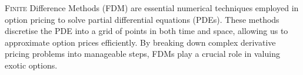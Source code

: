 \lettrine[lines=2, lhang=0.1]{F}{inite} Difference Methods (FDM) are essential numerical techniques employed in option pricing to solve partial differential equations (PDEs). These methods discretise the PDE into a grid of points in both time and space, allowing us to approximate option prices efficiently. By breaking down complex derivative pricing problems into manageable steps, FDMs play a crucial role in valuing exotic options.